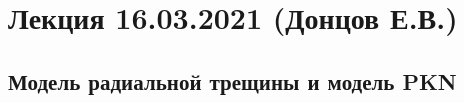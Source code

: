 \documentclass[main.tex]{subfiles}
\begin{document}

\section{Лекция 16.03.2021 (Донцов Е.В.)}

\subsection{Модель радиальной трещины и модель PKN}
\end{document}
